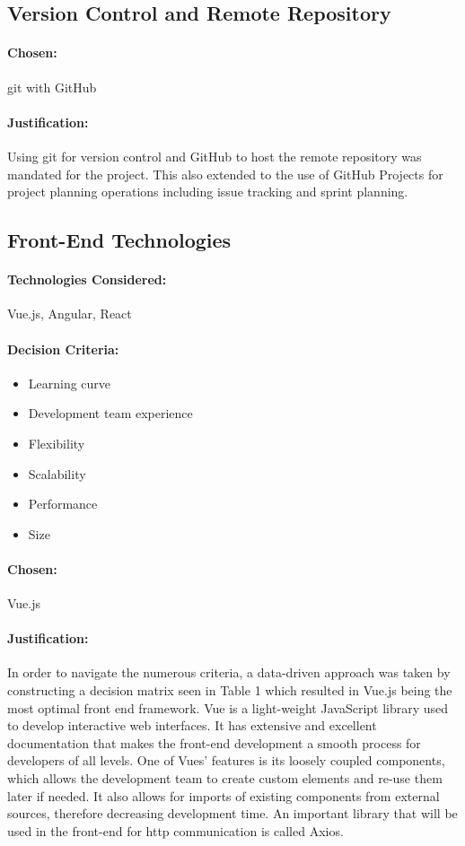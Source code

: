 \begin{spacing}{1.3}
\subsection{Version Control and Remote Repository}
\paragraph{Chosen:}git with GitHub
\paragraph{Justification:}
Using git for version control and GitHub to host the remote repository was mandated for the project. This also extended to the use of GitHub Projects for project planning operations including issue tracking and sprint planning.

\subsection{Front-End Technologies}
\paragraph{Technologies Considered:}
Vue.js, Angular, React

\paragraph{Decision Criteria:}
\begin{itemize}
\item Learning curve
\item Development team experience
\item Flexibility
\item Scalability
\item Performance
\item Size
\end{itemize}

\paragraph{Chosen:} Vue.js
\paragraph{Justification:} In order to navigate the numerous criteria, a data-driven approach was taken by constructing a decision matrix seen in Table 1 which resulted in Vue.js being the most optimal front end framework. Vue is a light-weight JavaScript library used to develop interactive web interfaces. It has extensive and excellent documentation that makes the front-end development a smooth process for developers of all levels. One of Vues' features is its loosely coupled components, which allows the development team to create custom elements and re-use them later if needed. It also allows for imports of existing components from external sources, therefore decreasing development time. An important library that will be used in the front-end for http communication is called Axios.


\end{spacing}
